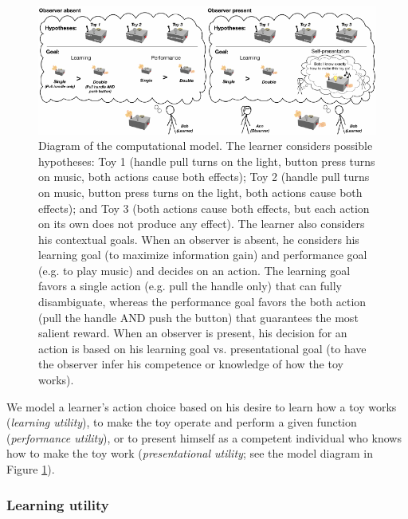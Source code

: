 \documentclass[10pt, letterpaper]{article}
\newenvironment{CodeChunk}{}{}
\begin{document}
\begin{CodeChunk}
\begin{figure}[tb]

{\centering \includegraphics[width=0.95\linewidth]{figs/model_diagram-1} 

}

\caption[Diagram of the computational model]{Diagram of the computational model. The learner considers possible hypotheses: Toy 1 (handle pull turns on the light, button press turns on music, both actions cause both effects); Toy 2 (handle pull turns on music, button press turns on the light, both actions cause both effects); and Toy 3 (both actions cause both effects, but each action on its own does not produce any effect). The learner also considers his contextual goals. When an observer is absent, he considers his learning goal (to maximize information gain) and performance goal (e.g. to play music) and decides on an action. The learning goal favors a single action (e.g. pull the handle only) that can fully disambiguate, whereas the performance goal favors the both action (pull the handle AND push the button) that guarantees the most salient reward. When an observer is present, his decision for an action is based on his learning goal vs. presentational goal (to have the observer infer his competence or knowledge of how the toy works).}\label{fig:model_diagram}
\end{figure}
\end{CodeChunk}

We model a learner's action choice based on his desire to learn how a
toy works (\emph{learning utility}), to make the toy operate and perform
a given function (\emph{performance utility}), or to present himself as
a competent individual who knows how to make the toy work
(\emph{presentational utility}; see the model diagram in Figure
\ref{fig:model_diagram}).

\subsubsection{Learning utility}\label{learning-utility}
\end{document}

